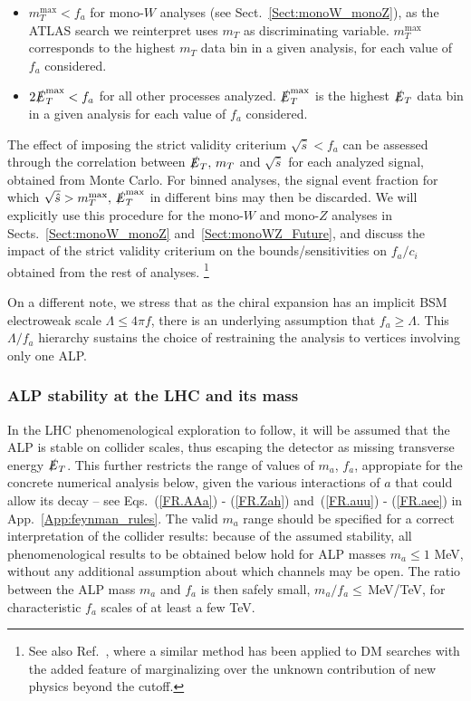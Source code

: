 \documentclass[11pt]{article}
\newcommand{\ETmiss}{\slashed{E}_T}
\renewcommand{\[}{\begin{equation}}
\renewcommand{\]}{\end{equation}}
\begin{document}
\begin{itemize}

\item $m_T^\text{max}<f_a$ for mono-$W$ analyses (see Sect.~\ref{Sect:monoW_monoZ}), as the ATLAS search we reinterpret uses $m_T$ as discriminating variable.  
$m_T^\text{max}$ corresponds to the highest $m_T$ data bin 
in a given analysis, for each value of $f_a$ considered.

\item $2\ETmiss^\text{max}<f_a$ for all other processes analyzed.  
$\ETmiss^\text{max}$ is the highest $\ETmiss$ data bin in a given analysis for each value of $f_a$ considered.
\end{itemize}

The effect of imposing the strict validity criterium $\sqrt{\hat{s}} < f_a$ can be assessed through the correlation between $\ETmiss,\,m_T$ and $\sqrt{\hat{s}}$ 
for each analyzed signal, obtained from Monte Carlo. For binned analyses, the signal event fraction for 
which $\sqrt{\hat{s}}> m_T^\text{max},\,\ETmiss^\text{max}$ in different bins may then be discarded. We will explicitly use this procedure 
for the mono-$W$ and mono-$Z$ analyses in Sects.~\ref{Sect:monoW_monoZ} and~\ref{Sect:monoWZ_Future}, 
and discuss the impact of the strict validity criterium on the bounds/sensitivities on $f_a/c_i$ obtained from the rest of analyses. \footnote{
See also Ref.~\cite{Pobbe:2017wrj}, where a similar method has been applied to DM searches with the added feature of marginalizing over the unknown contribution of new physics beyond the cutoff.}

On a different note, we stress that as the chiral expansion has an implicit BSM electroweak scale $\Lambda\le 4\pi f$, there is an underlying assumption 
that $f_a\ge \Lambda$. This $\Lambda/f_a$ hierarchy sustains the choice of restraining the analysis to vertices involving only one ALP.  


\subsubsection*{ALP stability at the LHC and its mass} 
In the LHC phenomenological exploration to follow, it will be assumed that the ALP is stable on collider scales, thus escaping  
the detector as missing transverse energy $\ETmiss$. This further restricts the range of values of  $m_a$, $f_a$, 
appropiate for the concrete numerical analysis below, given the various interactions of $a$ that could allow its decay -- see Eqs.~(\ref{FR.AAa}) - (\ref{FR.Zah})
and~(\ref{FR.auu}) - (\ref{FR.aee}) in App.~\ref{App:feynman_rules}.  The valid $m_a$ range  should be specified for a correct interpretation of the collider results: 
because of the assumed stability, all phenomenological results to be obtained below hold for ALP masses $m_a\le1$ MeV, without any additional assumption about which channels may be open.  
The ratio between the ALP mass $m_a$ and $f_a$  is then safely small, $m_a/f_a\le\,$MeV/TeV, for characteristic $f_a$ scales  of at least 
a few TeV. 
\end{document}
